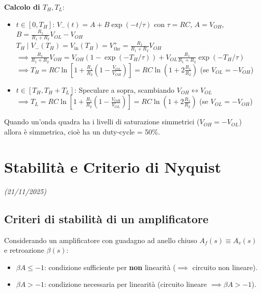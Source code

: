 \documentclass[11pt,a4paper]{report}
\begin{document}
\textbf{Calcolo di $T_H, T_L$}:
\begin{itemize}
    \item $t \in [0, T_H]$: 
    $V_-(t) = A + B \exp(-t/\tau)$ con $\tau = RC$, $A = V_{OH}$, $B = \frac{R_1}{R_1+R_2} V_{OL} - V_{OH}$ \\
    $T_H \mid V_-(T_H) = V_{\text{in}}(T_H) = V_{\text{thr}}^+ = \frac{R_1}{R_1+R_2} V_{OH}$ \\
    $\implies \frac{R_1}{R_1+R_2} V_{OH} = V_{OH}\left(1 - \exp(-T_H/\tau)\right) + V_{OL} \frac{R_1}{R_1+R_2} \exp(-T_H/\tau)$ \\
    $\implies T_H = RC \ln \left[ 1 + \frac{R_1}{R_2} \left( 1 - \frac{V_{OL}}{V_{OH}} \right) \right] = RC \ln\left(1 + 2\frac{R_1}{R_2}\right)$ (se $V_{OL} = -V_{OH}$)
    
    \item $t \in [T_H, T_H + T_L]$:
    Speculare a sopra, scambiando $V_{OH} \leftrightarrow V_{OL}$ \\
    $\implies T_L = RC \ln \left[ 1 + \frac{R_1}{R_2} \left( 1 - \frac{V_{OH}}{V_{OL}} \right) \right] = RC \ln\left(1 + 2\frac{R_1}{R_2}\right)$ (se $V_{OL} = -V_{OH}$)
\end{itemize}

Quando un'onda quadra ha i livelli di saturazione simmetrici ($V_{OH} = -V_{OL}$) allora è simmetrica, cioè ha un duty-cycle = 50\%.


\chapter{Stabilità e Criterio di Nyquist}
\textit{(21/11/2025)}

\section{Criteri di stabilità di un amplificatore}
Considerando un amplificatore con guadagno ad anello chiuso $A_f(s) \equiv A_v(s)$ e retroazione $\beta(s)$:
\begin{itemize}
    \item $\beta A \le -1$: condizione sufficiente per \textbf{non} linearità ($\implies$ circuito non lineare).
    \item $\beta A > -1$: condizione necessaria per linearità (circuito lineare $\implies \beta A > -1$).
\end{itemize}
\end{document}
